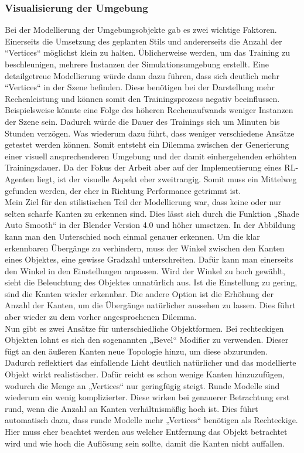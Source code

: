 \subsubsection{Visualisierung der Umgebung}
\label{vis_umgebung}
Bei der Modellierung der Umgebungsobjekte gab es zwei wichtige Faktoren. Einerseits die Umsetzung des geplanten Stils und andererseits die Anzahl der “Vertices“ möglichst klein zu halten. Üblicherweise werden, um das Training zu beschleunigen, mehrere Instanzen der Simulationsumgebung erstellt. Eine detailgetreue Modellierung würde dann dazu führen, dass sich deutlich mehr “Vertices“ in der Szene befinden. Diese benötigen bei der Darstellung mehr Rechenleistung und können somit den Trainingsprozess negativ beeinflussen. Beispielsweise könnte eine Folge des höheren Rechenaufwands weniger Instanzen der Szene sein. Dadurch würde die Dauer des Trainings sich um Minuten bis Stunden verzögen. Was wiederum dazu führt, dass weniger verschiedene Ansätze getestet werden können. Somit entsteht ein Dilemma zwischen der Generierung einer visuell ansprechenderen Umgebung und der damit einhergehenden erhöhten Trainingsdauer. Da der Fokus der Arbeit aber auf der Implementierung eines RL-Agenten liegt, ist der visuelle Aspekt eher zweitrangig. Somit muss ein Mittelweg gefunden werden, der eher in Richtung Performance getrimmt ist. 
\\
Mein Ziel für den stilistischen Teil der Modellierung war, dass keine oder nur selten scharfe Kanten zu erkennen sind. Dies lässt sich durch die Funktion „Shade Auto Smooth“ in der Blender Version 4.0 und höher umsetzen. In der Abbildung kann man den Unterschied noch einmal genauer erkennen. Um die klar erkennbaren Übergänge zu verhindern, muss der Winkel zwischen den Kanten eines Objektes, eine gewisse Gradzahl unterschreiten. Dafür kann man einerseits den Winkel in den Einstellungen anpassen. Wird der Winkel zu hoch gewählt, sieht die Beleuchtung des Objektes unnatürlich aus. Ist die Einstellung zu gering, sind die Kanten wieder erkennbar. Die andere Option ist die Erhöhung der Anzahl der Kanten, um die Übergänge natürlicher aussehen zu lassen. Dies führt aber wieder zu dem vorher angesprochenen Dilemma. 
\\
Nun gibt es zwei Ansätze für unterschiedliche Objektformen. Bei rechteckigen Objekten lohnt es sich den sogenannten „Bevel“ Modifier zu verwenden. Dieser fügt an den äußeren Kanten neue Topologie hinzu, um diese abzurunden. Dadurch reflektiert das einfallende Licht deutlich natürlicher und das modellierte Objekt wirkt realistischer. Dafür reicht es schon wenige Kanten hinzuzufügen, wodurch die Menge an „Vertices“ nur geringfügig steigt. Runde Modelle sind wiederum ein wenig komplizierter. Diese wirken bei genauerer Betrachtung erst rund, wenn die Anzahl an Kanten verhältnismäßig hoch ist. Dies führt automatisch dazu, dass runde Modelle mehr „Vertices“ benötigen als Rechteckige. Hier muss eher beachtet werden aus welcher Entfernung das Objekt betrachtet wird und wie hoch die Auflösung sein sollte, damit die Kanten nicht auffallen. 
